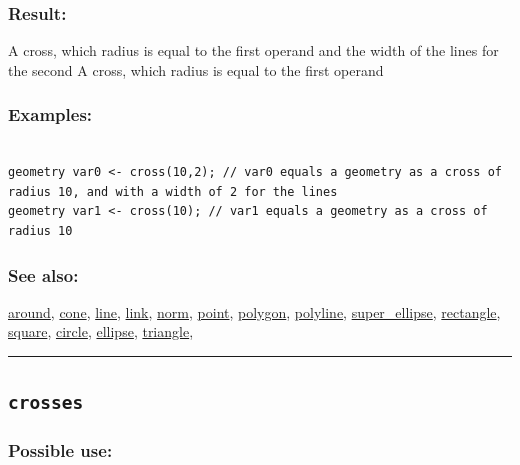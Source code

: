 \documentclass[]{book}
\theoremstyle{definition}
\theoremstyle{definition}
\theoremstyle{definition}
\theoremstyle{remark}
\begin{document}
\subsubsection{Result:}\label{result-113}

A cross, which radius is equal to the first operand and the width of the
lines for the second A cross, which radius is equal to the first operand

\subsubsection{Examples:}\label{examples-88}

\begin{verbatim}
 
geometry var0 <- cross(10,2); // var0 equals a geometry as a cross of radius 10, and with a width of 2 for the lines  
geometry var1 <- cross(10); // var1 equals a geometry as a cross of radius 10
\end{verbatim}

\subsubsection{See also:}\label{see-also-71}

\href{operators-a-to-a.html\#around}{around},
\href{operators-b-to-c.html\#cone}{cone},
\href{operators-i-to-m.html\#line}{line},
\href{operators-i-to-m.html\#link}{link},
\href{operators-n-to-r.html\#norm}{norm},
\href{operators-n-to-r.html\#point}{point},
\href{operators-n-to-r.html\#polygon}{polygon},
\href{operators-n-to-r.html\#polyline}{polyline},
\href{operators-s-to-z.html\#super_ellipse}{super\_ellipse},
\href{operators-n-to-r.html\#rectangle}{rectangle},
\href{operators-s-to-z.html\#square}{square},
\href{operators-b-to-c.html\#circle}{circle},
\href{operators-d-to-h.html\#ellipse}{ellipse},
\href{operators-s-to-z.html\#triangle}{triangle},

\begin{center}\rule{0.5\linewidth}{\linethickness}\end{center}

\subsection{\texorpdfstring{\texttt{crosses}}{crosses}}\label{crosses}

\subsubsection{Possible use:}\label{possible-use-117}
\end{document}
